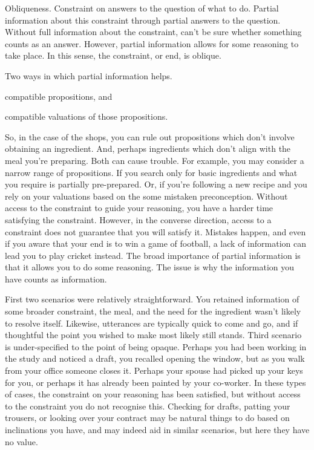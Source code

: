 \documentclass[10pt]{article}
\begin{document}
Obliqueness.
Constraint on answers to the question of what to do.
Partial information about this constraint through partial answers to the question.
Without full information about the constraint, can't be sure whether something counts as an answer.
However, partial information allows for some reasoning to take place.
In this sense, the constraint, or end, is oblique.

Two ways in which partial information helps.
\begin{enumerate*}[label=\arabic*.]
\item compatible propositions, and
\item compatible valuations of those propositions.
\end{enumerate*}
So, in the case of the shops, you can rule out propositions which don't involve obtaining an ingredient.
And, perhaps ingredients which don't align with the meal you're preparing.
Both can cause trouble.
For example, you may consider a narrow range of propositions.
If you search only for basic ingredients and what you require is partially pre-prepared.
Or, if you're following a new recipe and you rely on your valuations based on the some mistaken preconception.
Without access to the constraint to guide your reasoning, you have a harder time satisfying the constraint.
However, in the converse direction, access to a constraint does not guarantee that you will satisfy it.
Mistakes happen, and even if you aware that your end is to win a game of football, a lack of information can lead you to play cricket instead.
The broad importance of partial information is that it allows you to do some reasoning.
The issue is why the information you have counts as information.

First two scenarios were relatively straightforward.
You retained information of some broader constraint, the meal, and the need for the ingredient wasn't likely to resolve itself.
Likewise, utterances are typically quick to come and go, and if thoughtful the point you wished to make most likely still stands.
Third scenario is under-specified to the point of being opaque.
Perhaps you had been working in the study and noticed a draft, you recalled opening the window, but as you walk from your office someone closes it.
Perhaps your spouse had picked up your keys for you, or perhaps it has already been painted by your co-worker.
In these types of cases, the constraint on your reasoning has been satisfied, but without access to the constraint you do not recognise this.
Checking for drafts, patting your trousers, or looking over your contract may be natural things to do based on inclinations you have, and may indeed aid in similar scenarios, but here they have no value.
\end{document}
